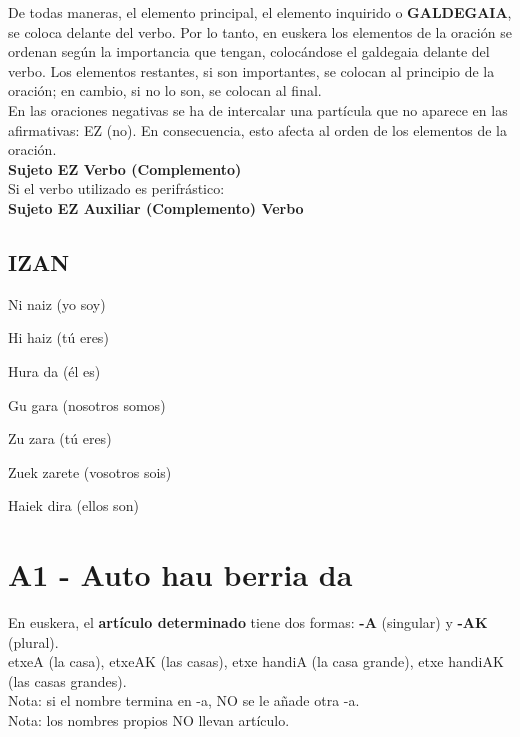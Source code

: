 \documentclass[11pt, a4paper]{article}
\begin{document}
De todas maneras, el elemento principal, el elemento inquirido o \textbf{GALDEGAIA}, se coloca delante del verbo. Por lo tanto, en euskera los elementos de la oración se ordenan según la importancia que tengan, colocándose el galdegaia delante del verbo. Los elementos restantes, si son importantes, se colocan al principio de la oración; en cambio, si no lo son, se colocan al final.\\

En las oraciones negativas se ha de intercalar una partícula que no aparece en las afirmativas: EZ (no). En consecuencia, esto afecta al orden de los elementos de la oración.\\
\indent \textbf{Sujeto EZ Verbo (Complemento)}\\

Si el verbo utilizado es perifrástico:\\
\indent \textbf{Sujeto EZ Auxiliar (Complemento) Verbo}

\subsection{IZAN}
\begin{itemize}
\begin{multicols}{2}
\item Ni naiz (yo soy)
\item Hi haiz (tú eres)
\item Hura da (él es)\\
\item Gu gara (nosotros somos)
\item Zu zara (tú eres)
\item Zuek zarete (vosotros sois)
\item Haiek dira (ellos son)
\end{multicols}
\end{itemize}

\section{A1 - Auto hau berria da}
En euskera, el \textbf{artículo determinado} tiene dos formas: \textbf{-A} (singular) y \textbf{-AK} (plural).\\
etxeA (la casa), etxeAK (las casas), etxe handiA (la casa grande), etxe handiAK (las casas grandes).\\
Nota: si el nombre termina en -a, NO se le añade otra -a.\\
Nota: los nombres propios NO llevan artículo.\\
\end{document}
